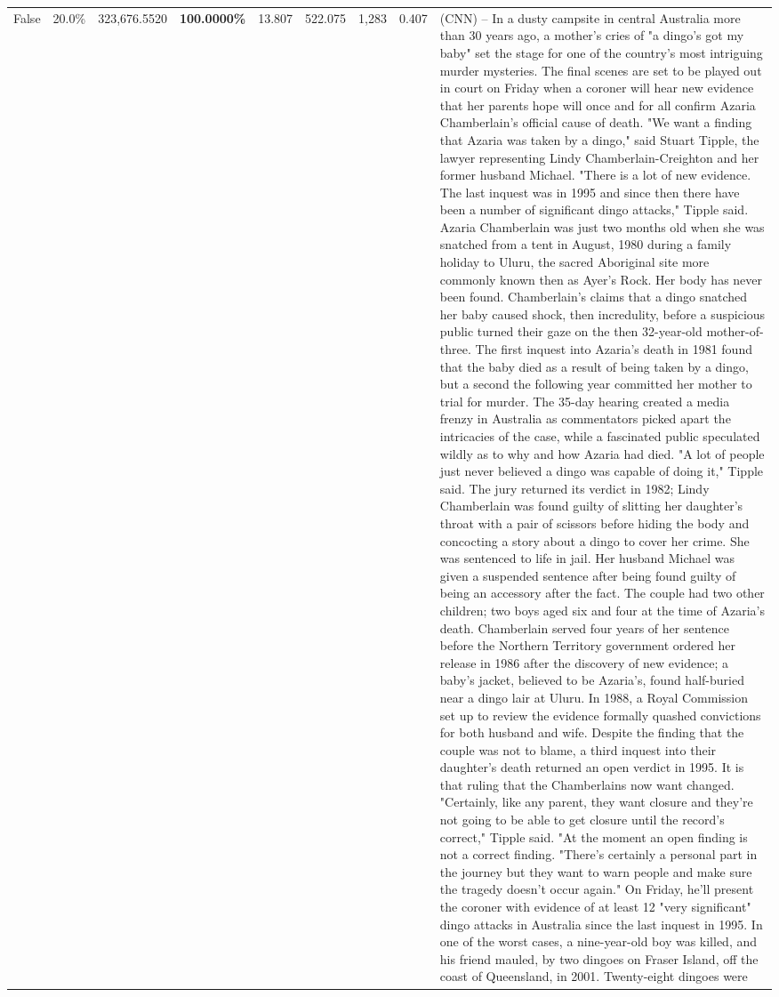 \begin{table}[H]
\begin{tabular}{lllrlllll}
False & 20.0\% & 323,676.5520 & \bfseries \color{red} 100.0000\% & 13.807 & 522.075 & 1,283 & 0.407 & (CNN) -- In a dusty campsite in central Australia more than 30 years ago, a mother's cries of "a dingo's got my baby" set the stage for one of the country's most intriguing murder mysteries. The final scenes are set to be played out in court on Friday when a coroner will hear new evidence that her parents hope will once and for all confirm Azaria Chamberlain's official cause of death. "We want a finding that Azaria was taken by a dingo," said Stuart Tipple, the lawyer representing Lindy Chamberlain-Creighton and her former husband Michael. "There is a lot of new evidence. The last inquest was in 1995 and since then there have been a number of significant dingo attacks," Tipple said. Azaria Chamberlain was just two months old when she was snatched from a tent in August, 1980 during a family holiday to Uluru, the sacred Aboriginal site more commonly known then as Ayer's Rock. Her body has never been found. Chamberlain's claims that a dingo snatched her baby caused shock, then incredulity, before a suspicious public turned their gaze on the then 32-year-old mother-of-three. The first inquest into Azaria's death in 1981 found that the baby died as a result of being taken by a dingo, but a second the following year committed her mother to trial for murder. The 35-day hearing created a media frenzy in Australia as commentators picked apart the intricacies of the case, while a fascinated public speculated wildly as to why and how Azaria had died. "A lot of people just never believed a dingo was capable of doing it," Tipple said. The jury returned its verdict in 1982; Lindy Chamberlain was found guilty of slitting her daughter's throat with a pair of scissors before hiding the body and concocting a story about a dingo to cover her crime. She was sentenced to life in jail. Her husband Michael was given a suspended sentence after being found guilty of being an accessory after the fact. The couple had two other children; two boys aged six and four at the time of Azaria's death. Chamberlain served four years of her sentence before the Northern Territory government ordered her release in 1986 after the discovery of new evidence; a baby's jacket, believed to be Azaria's, found half-buried near a dingo lair at Uluru. In 1988, a Royal Commission set up to review the evidence formally quashed convictions for both husband and wife. Despite the finding that the couple was not to blame, a third inquest into their daughter's death returned an open verdict in 1995. It is that ruling that the Chamberlains now want changed. "Certainly, like any parent, they want closure and they're not going to be able to get closure until the record's correct," Tipple said. "At the moment an open finding is not a correct finding. "There's certainly a personal part in the journey but they want to warn people and make sure the tragedy doesn't occur again." On Friday, he'll present the coroner with evidence of at least 12 "very significant" dingo attacks in Australia since the last inquest in 1995. In one of the worst cases, a nine-year-old boy was killed, and his friend mauled, by two dingoes on Fraser Island, off the coast of Queensland, in 2001. Twenty-eight dingoes were 
\end{tabular}
\end{table}
